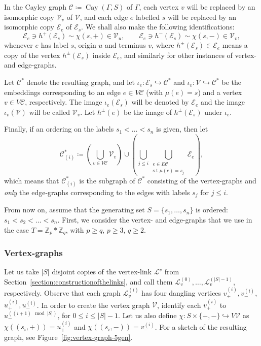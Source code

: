 \documentclass[10pt,a4paper]{amsart}
\theoremstyle{definition}
\newcommand{\cC}{\mathcal{C}}
\newcommand{\cL}{\mathcal{L}}
\newcommand{\cV}{\mathcal{V}}
\newcommand{\cE}{\mathcal{E}}
\DeclareMathOperator{\Cay}{Cay}
\begin{document}
In the Cayley graph $\cC \coloneqq \Cay({\Gamma},S)$ of ${\Gamma}$, each vertex $v$ will be replaced by an isomorphic copy $\cV_v$ of $\cV$, and each edge $e$ labelled $s$ will be replaced by an isomorphic copy $\cE_e$ of $\cE_s$. We shall also make the following identifications:
 \[
 \cE_e \ni h^{+}(\cE_s) \sim {\chi}(s,+) \in \cV_u, \qquad \cE_e \ni h^{-}(\cE_s) \sim {\chi}(s,-) \in \cV_v,
 \]
whenever $e$ has label $s$, origin $u$ and terminus $v$, where $h^{\pm}(\cE_s) \in \cE_e$ means a copy of the vertex $h^{\pm}(\cE_s)$ inside $\cE_e$, and similarly for other instances of vertex- and edge-graphs. 

Let $\cC^*$ denote the resulting graph, and let ${\iota}_e:\cE_s {\hookrightarrow} \cC^*$ and ${\iota}_v:\cV {\hookrightarrow} \cC^*$ be the embeddings corresponding to an edge $e \in V\cC$ (with $\mu(e) = s$) and a vertex $v\in V\cC$, respectively. The image ${\iota}_e(\cE_s)$ will be denoted by $\cE_e$ and the image ${\iota}_v(\cV)$ will be called $\cV_v$. Let $h^{\pm}(e)$ be the image of $h^{\pm}(\cE_s)$ under ${\iota}_e$.

Finally, if an ordering on the labels $s_{1} < \dots < s_n$ is given, then let 
\[
 \cC^*_{(i)} \coloneqq \left(\bigcup_{v\in V\cC} \cV_v \right) \cup \left(\bigcup_{j\leq i} \bigcup_{\substack{e\in E\cC\ \\ \text{s.t.} {\mu}(e)=s_j}} \cE_e \right),
\]
which means that $\cC^*_{(i)}$ is the subgraph of $\cC^*$ consisting of the vertex-graphs and \emph{only} the edge-graphs corresponding to the edges with labels $s_j$ for $j\leq i$.

From now on, assume that the generating set $S = \{s_{1}, \dots, s_n\}$ is ordered: $s_1 < s_2 < \dots < s_n$. First, we consider the vertex- and edge-graphs that we use in the case $T = \mathbb{Z}_p*\mathbb{Z}_q$, with $p \geq q$, $p\geq 3$, $q\geq 2$. 


\subsubsection*{Vertex-graphs} 
Let us take $|S|$ disjoint copies of the vertex-link $\cL^{v}$ from Section~\ref{section:constructionofthelinks}, and call them $\cL_v ^{(0)}, \dots, \cL_v ^{(|S|-1)}$, respectively. Observe that each graph $\cL_v ^{(i)}$ has four dangling vertices $v^{(i)}_+,v^{(i)}_-$, $u^{(i)}_+,u^{(i)}_-$. In order to create the vertex graph $\cV$, identify each $v^{(i)}_+$ to $u^{((i+1) \mod |S|)}_-$, for $0\leq i\leq |S|-1$. Let us also define $\chi : S{\times}\{+,-\} \hookrightarrow V\cV$ as $\chi((s_i,+))=u_+^{(i)}$ and $\chi((s_i,-))=v_-^{(i)}$. For a sketch of the resulting graph, see Figure~\ref{fig:vertex-graph-5gen}. 
 
\end{document}

